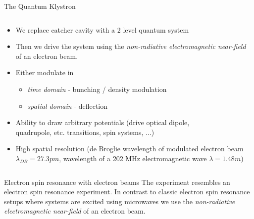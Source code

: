 \documentclass[final]{beamer}
\begin{document}
\begin{frame}[fragile]{}
\begin{columns}[T]
\begin{column}{.49\linewidth}
\begin{block}{\large The Quantum Klystron}
\begin{columns}
\begin{column}{0.6\columnwidth}
            \begin{itemize}
              \item We replace catcher cavity with a 2 level quantum system
              \item Then we drive the system using the \textit{non-radiative electromagnetic near-field}
                    of an electron beam.
              \item Either modulate in
              \begin{itemize}
                  \item \textit{time domain} - bunching / density modulation
                  \item \textit{spatial domain} - deflection
              \end{itemize}
              \item Ability to draw arbitrary potentials (drive optical dipole, \\quadrupole, etc. transitions, spin systems, $\ldots$)
              \item High spatial resolution (de Broglie wavelength of modulated electron beam $\lambda_{DB}= 27.3 pm$, wavelength of a 202 MHz electromagnetic wave $\lambda=1.48m$)
            \end{itemize}
          \end{column}
        \end{columns}
      \end{block}

      \begin{block}{\large Electron spin resonance with electron beams}
        The experiment resembles an electron spin resonance experiment. In contrast to
        classic electron spin resonance setups where systems are excited using microwaves
        we use the \textit{non-radiative electromagnetic near-field} of an electron beam.


\end{block}
\end{column}
\end{columns}
\end{frame}
\end{document}
